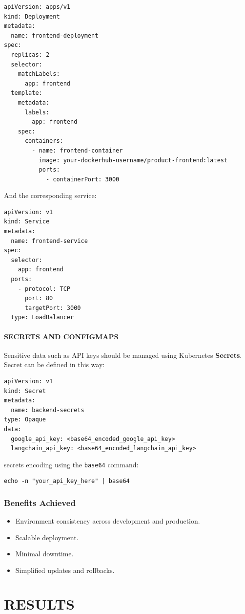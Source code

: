 \documentclass[12pt]{report}
\begin{document}
\begin{verbatim}
apiVersion: apps/v1
kind: Deployment
metadata:
  name: frontend-deployment
spec:
  replicas: 2
  selector:
    matchLabels:
      app: frontend
  template:
    metadata:
      labels:
        app: frontend
    spec:
      containers:
        - name: frontend-container
          image: your-dockerhub-username/product-frontend:latest
          ports:
            - containerPort: 3000
\end{verbatim}

And the corresponding service:

\begin{verbatim}
apiVersion: v1
kind: Service
metadata:
  name: frontend-service
spec:
  selector:
    app: frontend
  ports:
    - protocol: TCP
      port: 80
      targetPort: 3000
  type: LoadBalancer
\end{verbatim}

\subsubsection{SECRETS AND CONFIGMAPS}

Sensitive data such as API keys should be managed using Kubernetes \textbf{Secrets}. 
Secret can be defined in this way:

\begin{verbatim}
apiVersion: v1
kind: Secret
metadata:
  name: backend-secrets
type: Opaque
data:
  google_api_key: <base64_encoded_google_api_key>
  langchain_api_key: <base64_encoded_langchain_api_key>
\end{verbatim}

 secrets encoding using the \texttt{base64} command:
\begin{verbatim}
echo -n "your_api_key_here" | base64
\end{verbatim}



\subsection{Benefits Achieved}
\begin{itemize}
\item Environment consistency across development and production.
\item Scalable deployment.
\item Minimal downtime.
\item Simplified updates and rollbacks.
\end{itemize}
\chapter{RESULTS}
\end{document}
